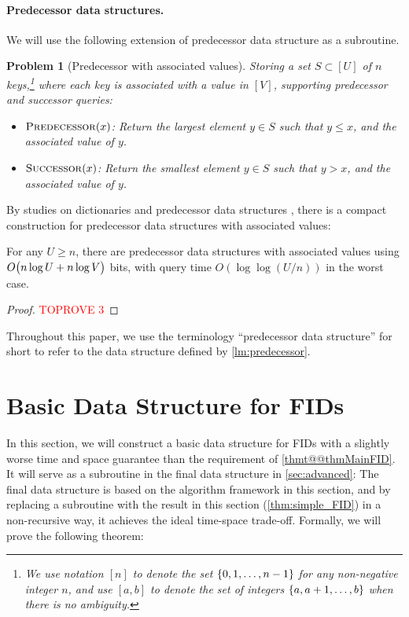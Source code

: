 \documentclass{article}
\theoremstyle{plain}
\newtheorem{prob}{Problem}  \newtheorem{open}[prob]{Open Question}
\theoremstyle{definition}  \newtheorem{definition}[theorem]{Definition}
\DeclarePairedDelimiter{\bk}{(}{)}
\DeclarePairedDelimiter{\BK}{\{}{\}}
\begin{document}
\paragraph*{Predecessor data structures.}
We will use the following extension of predecessor data structure as a subroutine.

\begin{prob}[Predecessor with associated values]
  Storing a set $S \subset [U]$ of $n$ keys,\footnote{We use notation $[n]$ to denote the set $\BK{0,1,\ldots,n-1}$ for any non-negative integer $n$, and use $[a, b]$ to denote the set of integers $\BK{a, a+1, \dots, b}$ when there is no ambiguity.} where each key is associated with a value in $[V]$, supporting predecessor and successor queries:
  \begin{itemize}
  \item $\textup{\textsc{Predecessor}}(x)$: Return the largest element $y \in S$ such that $y \le x$, and the associated value of $y$.
  \item $\textup{\textsc{Successor}}(x)$: Return the smallest element $y \in S$ such that $y > x$, and the associated value of $y$.
  \end{itemize}   
\end{prob}
By studies on dictionaries \cite{fredman1984storing} and predecessor data structures \cite{patrascu2006timespace}, there is a compact construction for predecessor data structures with associated values:
\begin{lemma}
  \label{lm:predecessor}
  For any $U \ge n$, there are predecessor data structures with associated values using $O\bk[\big]{n\log U + n \log V}$ bits, with query time $O(\log \log (U/n))$ in the worst case.
\end{lemma}
\begin{proof}\textcolor{red}{TOPROVE 3}\end{proof}

Throughout this paper, we use the terminology ``predecessor data structure'' for short to refer to the data structure defined by \cref{lm:predecessor}.

 
\section{Basic Data Structure for FIDs}
\label{sec:simple}

In this section, we will construct a basic data structure for FIDs with a slightly worse time and space guarantee than the requirement of \cref{thmt@@thmMainFID}. It will serve as a subroutine in the final data structure in \cref{sec:advanced}: The final data structure is based on the algorithm framework in this section, and by replacing a subroutine with the result in this section (\cref{thm:simple_FID}) in a non-recursive way, it achieves the ideal time-space trade-off. Formally, we will prove the following theorem:
\end{document}
